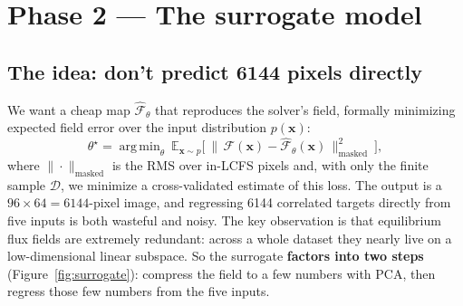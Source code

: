 \documentclass[11pt]{article}
\newcommand{\bx}{\mathbf{x}}
\newcommand{\Ffwd}{\mathcal{F}}
\newcommand{\Fhat}{\hat{\mathcal{F}}}
\newcommand{\E}{\mathbb{E}}
\DeclareMathOperator*{\argmin}{arg\,min}
\begin{document}
\section{Phase 2 --- The surrogate model}

\subsection{The idea: don't predict 6144 pixels directly}
We want a cheap map $\Fhat_\theta$ that reproduces the solver's field, formally minimizing expected
field error over the input distribution $p(\bx)$:
\begin{equation}
\theta^\star=\argmin_\theta\ \E_{\bx\sim p}\Big[\ \big\|\,\Ffwd(\bx)-\Fhat_\theta(\bx)\,\big\|^2_{\text{masked}}\ \Big],
\end{equation}
where $\|\cdot\|_{\text{masked}}$ is the RMS over in-LCFS pixels and, with only the finite sample
$\mathcal{D}$, we minimize a cross-validated estimate of this loss. The output is a
$96\times64=6144$-pixel image, and regressing 6144 correlated targets directly from five inputs is
both wasteful and noisy. The key observation is that equilibrium flux fields are extremely
redundant: across a whole dataset they nearly live on a low-dimensional linear subspace. So the
surrogate \textbf{factors into two steps} (Figure~\ref{fig:surrogate}): compress the field to a
few numbers with PCA, then regress those few numbers from the five inputs.
\end{document}
